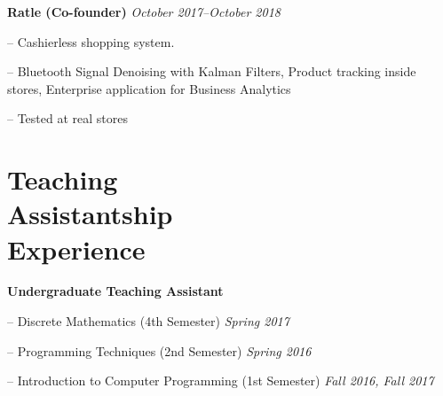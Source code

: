 \documentclass[margin, 10pt]{res}
\newcommand{\field}[2]{\noindent \textbf{#1} \hfill #2 \\}
\begin{document}
\begin{resume}
\field{Ratle (Co-founder)} {\emph{October 2017--October 2018}}
\begin{compactitem}
\item[--] Cashierless shopping system.
\item[--] Bluetooth Signal Denoising with Kalman Filters, Product tracking inside stores, Enterprise application for Business Analytics
\item[--] Tested at real stores %
\end{compactitem}


\section{Teaching \\ Assistantship \\ Experience} 
\textbf{Undergraduate Teaching Assistant}
\begin{compactitem}
    \item[--] Discrete Mathematics (4th Semester) \hfill \emph{Spring 2017}
    \item[--] Programming Techniques (2nd Semester) \hfill \emph{Spring 2016}
    \item[--] Introduction to Computer Programming (1st Semester) \hfill \emph{Fall 2016, Fall 2017}
\end{compactitem}





\begin{comment}
\section{Data \\ Analysis \& \\ Visualization \\ Tools} 
\begin{compactitem}
\item[--] Python 
\item[--] Bash 
\item[--] MATLAB 
\item[--] GNU Octave 
\item[--] R
\item[--] Matplotlib 
\item[--] GNUPlot 
\item[--] Pandas
\item[--] Seaborn
\item[--] MySQL 
\item[--] MongoDB 
\end{compactitem}
\end{comment}


\end{resume}
\end{document}
